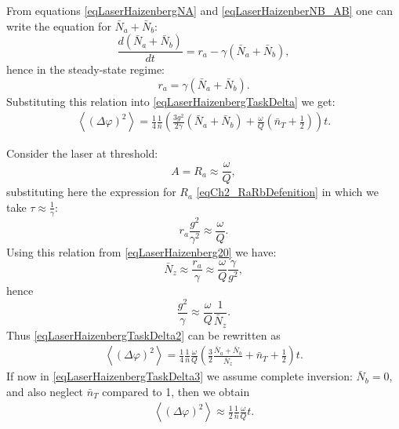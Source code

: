 From equations \eqref{eqLaserHaizenbergNA} and 
\eqref{eqLaserHaizenberNB_AB} one can write the equation for
$\bar{N}_a+\bar{N}_b$: 
\begin{equation}
\frac{d\left(\bar{N}_a+\bar{N}_b\right)}{d t} = r_a - \gamma
\left(\bar{N}_a+\bar{N}_b\right), 
\nonumber
\end{equation}
hence in the steady-state regime:
\begin{equation}
r_a = \gamma
\left(\bar{N}_a+\bar{N}_b\right).
\nonumber
\end{equation}
Substituting this relation into \eqref{eqLaserHaizenbergTaskDelta}
we get: 
\begin{eqnarray}
\left<\left(\Delta \varphi\right)^2\right> = 
\frac{1}{4}\frac{1}{\bar{n}}
\left(
\frac{3 g^2}{2\gamma}\left(\bar{N}_a + \bar{N}_b\right) + 
\frac{\omega}{Q}\left(\bar{n}_T + \frac{1}{2}\right)
\right) t.
\label{eqLaserHaizenbergTaskDelta2}
\end{eqnarray}

Consider the laser at threshold:
\begin{equation}
A=R_a\approx \frac{\omega}{Q},
\nonumber
\end{equation}
substituting here the expression for $R_a$ \eqref{eqCh2_RaRbDefenition} in
which we take $\tau \approx \frac{1}{\gamma}$:
\begin{equation}
r_a \frac{g^2}{\gamma^2} \approx \frac{\omega}{Q}.
\nonumber 
\end{equation}
Using this relation from \eqref{eqLaserHaizenberg20} we have:
\begin{equation}
\bar{N}_z \approx
\frac{r_a}{\gamma} \approx \frac{\omega}{Q} \frac{\gamma}{g^2},
\nonumber
\end{equation}
hence
\begin{equation}
\frac{g^2}{\gamma} \approx
\frac{\omega}{Q}\frac{1}{\bar{N}_z}.
\nonumber
\end{equation}
Thus \eqref{eqLaserHaizenbergTaskDelta2} can be rewritten as
\begin{eqnarray}
\left<\left(\Delta \varphi\right)^2\right> = 
\frac{1}{4}\frac{1}{\bar{n}}\frac{\omega}{Q}
\left(
\frac{3}{2}\frac{\bar{N}_a + \bar{N}_b}{\bar{N}_z} + 
\bar{n}_T + \frac{1}{2}
\right) t.
\label{eqLaserHaizenbergTaskDelta3}
\end{eqnarray}
If now in \eqref{eqLaserHaizenbergTaskDelta3} we assume
complete inversion: $\bar{N}_b = 0$, and also neglect $\bar{n}_T$ compared to 1, then we obtain
\begin{eqnarray}
\left<\left(\Delta \varphi\right)^2\right> \approx
\frac{1}{2}\frac{1}{\bar{n}}\frac{\omega}{Q} t.
\label{eqLaserHaizenbergTaskDelta4}
\end{eqnarray}

